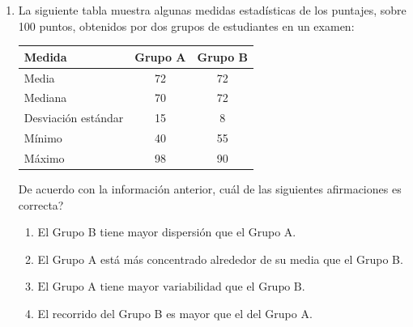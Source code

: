 \documentclass[11pt]{article}
\newcommand{\opcion}[2]{\item $#2$}
\begin{document}
\begin{enumerate}[label=\textbf{\arabic*.}, itemsep=2.5cm]
\textquestiondown Cu\'al de las siguientes afirmaciones sobre los diagramas de caja es correcta?

\begin{enumerate}[label=\Alph*)]
  \item El recorrido intercuart\'ilico del grupo A es menor que el del grupo B.
  \opcion{B}{\text{La mediana del grupo B es mayor que la del grupo A.}}
  \item El grupo A presenta menor dispersi\'on total que el grupo B.
  \item El recorrido de ambos grupos es igual.
\end{enumerate}

\Needspace{0.50\textheight}
\item
La siguiente tabla muestra algunas medidas estad\'isticas de los puntajes, sobre 100 puntos, obtenidos por dos grupos de estudiantes en un examen:

\begin{center}
\renewcommand{\arraystretch}{1.2}
\begin{tabular}{|l|c|c|}
\hline
\textbf{Medida}          & \textbf{Grupo A} & \textbf{Grupo B} \\
\hline
Media                    & 72 & 72 \\
Mediana                  & 70 & 72 \\
Desviaci\'on est\'andar  & 15 &  8 \\
M\'inimo                 & 40 & 55 \\
M\'aximo                 & 98 & 90 \\
\hline
\end{tabular}
\end{center}

De acuerdo con la informaci\'on anterior, \textquestiondown cu\'al de las siguientes afirmaciones es correcta?

\begin{enumerate}[label=\Alph*)]
  \item El Grupo B tiene mayor dispersi\'on que el Grupo A.
  \item El Grupo A est\'a m\'as concentrado alrededor de su media que el Grupo B.
  \opcion{C}{\text{El Grupo A tiene mayor variabilidad que el Grupo B.}}
  \item El recorrido del Grupo B es mayor que el del Grupo A.
\end{enumerate}

\end{enumerate}
\end{document}
